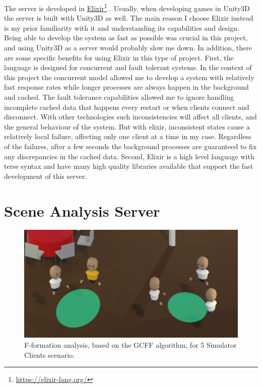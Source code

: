 \documentclass[]{simple-thesis}
\newcommand\fnurl[2]{%
  \href{#2}{#1}\footnote{\url{#2}}%
}
\begin{document}
The server is developed in \fnurl{Elixir}{https://elixir-lang.org/}.
Usually, when developing games in Unity3D the server is built with Unity3D as well.
The main reason I choose Elixir instead is my prior familiarity with it and understanding its capabilities and design.
Being able to develop the system as fast as possible was crucial in this project, and using Unity3D as a server would probably slow me down.
In addition, there are some specific benefits for using Elixir in this type of project.
First, the language is designed for concurrent and fault tolerant systems.
In the context of this project the concurrent model allowed me to develop a system with relatively fast response rates while longer processes are always happen in the background and cached.
The fault tolerance capabilities allowed me to ignore handling incomplete cached data that happens every restart or when clients connect and disconnect.
With other technologies such inconsistencies will affect all clients, and the general behaviour of the system.
But with elixir, inconsistent states cause a relatively local failure, affecting only one client at a time in my case.
Regardless of the failures, after a few seconds the background processes are guaranteed to fix any discrepancies in the cached data.
Second, Elixir is a high level language with terse syntax and have many high quality libraries available that support the fast development of this server.

\section{Scene Analysis Server}

\begin{figure}
  \centering
  \includegraphics[width=\textwidth]{../graphics/simulator_f_formation.png}
  \caption{F-formation analysis, based on the GCFF algorithm, for 5 Simulator Clients scenario.}
  \label{fig:system:simulator_f_formation}
\end{figure}
\end{document}
